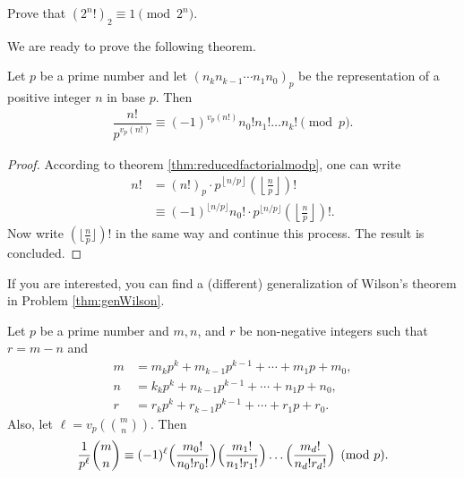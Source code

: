 \documentclass{subfile}
\begin{document}
	\begin{problem}
		Prove that $(2^n!)_2 \equiv 1 \pmod{2^n}$.
	\end{problem}

We are ready to prove the following theorem.

	\begin{theorem}\label{thm:wilsongeneral}
		Let $p$ be a prime number and let $(n_k n_{k-1}\cdots n_1 n_0)_p$ be the representation of a positive integer $n$ in base $p$. Then
			\begin{align}\label{eq:wilsongeneral}
				\dfrac{n!}{p^{v_p(n!)}}\equiv (-1)^{v_p(n!)} n_0!n_1!\dots n_k!\pmod p.
			\end{align}
	\end{theorem}

	\begin{proof}
		According to theorem \eqref{thm:reducedfactorialmodp}, one can write
			\begin{align*}
				n! &= (n!)_p \cdot p^{\left\lfloor n/p\right\rfloor}\left(\left\lfloor\frac{n}{p}\right\rfloor\right)!\\
				&\equiv (-1)^{\lfloor n/p\rfloor} n_0! \cdot p^{\lfloor n/p \rfloor}\left(\left\lfloor\frac{n}{p}\right\rfloor\right)!.
			\end{align*}
		Now write $(\lfloor \frac np\rfloor)!$ in the same way and continue this process. The result is concluded.
	\end{proof}

	\begin{note}
		If you are interested, you can find a (different) generalization of Wilson's theorem in Problem \ref{thm:genWilson}.
	\end{note}
	\begin{theorem}
		Let $p$ be a prime number and $m, n$, and $r$ be non-negative integers such that $r=m-n$ and
			\begin{align*}
				m&=m_kp^k+m_{k-1}p^{k-1}+\cdots +m_1p+m_0,\\
				n&=k_kp^k+n_{k-1}p^{k-1}+\cdots +n_1p+n_0,\\
				r&=r_kp^k+r_{k-1}p^{k-1}+\cdots +r_1p+r_0.
			\end{align*}
		Also, let $\ell = v_p\left(\binom{m}{n}\right)$. Then
			\begin{align*}
				\frac1{p^\ell}\binom{m}{n}\equiv (-1)^\ell
				\Bigl(\frac{m_0!}{n_0!r_0!}\Bigr) \Bigl(\frac{m_1!}{n_1!r_1!}\Bigr) \dots \Bigl(\frac{m_d!}{n_d!r_d!}\Bigr) \pmod p.
			\end{align*}
	\end{theorem}
\end{document}
